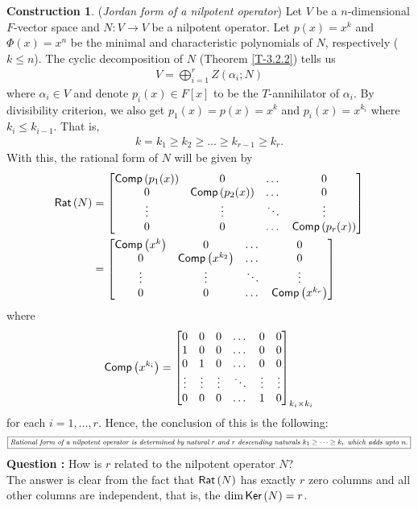 \documentclass[letterpaper,11pt,twoside]{article}
\theoremstyle{definition}
\theoremstyle{definition}
\theoremstyle{definition}
\theoremstyle{definition}
\theoremstyle{definition}
\newtheorem{construct}[proposition]{\textbf{Construction}}
\theoremstyle{definition}
\theoremstyle{remark}
\theoremstyle{definition}
\newcommand{\Ker}[1]{{\fontfamily{lmss}\selectfont 
		\text{Ker}\left (#1\right )
}}
\newcommand{\Comp}[1]{{\fontfamily{lmss}\selectfont 
            \text{Comp}\left(#1\right)
}}
\newcommand{\Rat}[1]{{\fontfamily{lmss}\selectfont 
		\text{Rat}\left(#1\right)
}}
\begin{document}
\begin{construct}\label{CT-3.3.1}
	(\textit{Jordan form of a nilpotent operator}) Let $ V $ be a $ n $-dimensional $ F $-vector space and $ N : V\to V $ be a nilpotent operator. Let $ p(x) = x^{k} $ and $ \Phi(x) = x^{n} $ be the minimal and characteristic polynomials of $ N $, respectively ($ k\le n $). The cyclic decomposition of $ N $ (Theorem \ref{T-3.2.2}) tells us
	\begin{align*}
		V = \bigoplus_{i=1}^{r} Z(\alpha_i;N)
	\end{align*}
	where $ \alpha_i \in V $ and denote $ p_i(x) \in F[x] $ to be the $ T $-annihilator of $ \alpha_i $. By divisibility criterion, we also get $ p_1(x) = p(x) = x^{k} $ and $ p_i(x) = x^{k_i} $ where $ k_{i} \le k_{i-1} $. That is,
	\begin{align*}
		k = k_1 \ge k_2 \ge \dots \ge k_{r-1} \ge k_{r}.
	\end{align*}
	With this, the rational form of $ N $ will be given by
	\begin{align*}
		\Rat{N} &= \begin{bmatrix}
			\Comp{p_1(x)} & 0 & \dots & 0\\
			0 & \Comp{p_2(x)} & \dots & 0\\
			\vdots & \vdots & \ddots & \vdots \\
			0 & 0 & \dots & \Comp{p_r(x)}
		\end{bmatrix}\\
	&= \begin{bmatrix}
		\Comp{x^{k}} & 0 & \dots & 0\\
		0 & \Comp{x^{k_2}} & \dots & 0\\
		\vdots & \vdots & \ddots & \vdots \\
		0 & 0 & \dots & \Comp{x^{k_r}}
	\end{bmatrix}
	\end{align*}
 	where 
 	\begin{align*}
 		\Comp{x^{k_i}} = \begin{bmatrix}
 			0 & 0 & 0& \dots & 0 & 0\\
 			1 & 0&  0 &\dots & 0 & 0\\
 			0 & 1& 0 & \dots & 0 & 0\\
 			\vdots & \vdots & \vdots& \ddots & \vdots  & \vdots\\
 			0 & 0 & 0 & \dots & 1 & 0
 		\end{bmatrix}_{k_{i}\times k_{i}}
 	\end{align*}
 for each $ i = 1,\dots, r $. Hence, the conclusion of this is the following:
 \begin{align*}
 	\boxed{\footnotesize\text{\textit{Rational form of a nilpotent operator is determined by natural $ r $ and $ r $ descending naturals $ k_1\ge \dots\ge k_r $ which adds upto $ n $}.}}
 \end{align*}
 \textbf{Question : }How is $ r $ related to the nilpotent operator $ N $?\\
 The answer is clear from the fact that $ \Rat{N} $ has exactly $ r $ zero columns and all other columns are independent, that is, the $ \dim \Ker{N} = r $.
\end{construct}
\end{document}
